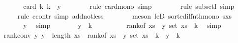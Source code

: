 \begin{isabellebody}
\ \ \ \ \isamarkupfalse%
\ \isamarkupfalse%
\ {\isachardoublequoteopen}{\isachardot}{\kern0pt}{\isachardot}{\kern0pt}{\isachardot}{\kern0pt}\ {\isasymle}\ card\ {\isacharbraceleft}{\kern0pt}k{\isachardot}{\kern0pt}\ k\ {\isacharless}{\kern0pt}\ y{\isacharbraceright}{\kern0pt}{\isachardoublequoteclose}\isanewline
\ \ \ \ \ \ \isamarkupfalse%
\ {\isacharparenleft}{\kern0pt}rule\ card{\isacharunderscore}{\kern0pt}mono{\isacharcomma}{\kern0pt}\ simp{\isacharparenright}{\kern0pt}\isanewline
\ \ \ \ \ \ \isamarkupfalse%
\ {\isacharparenleft}{\kern0pt}rule\ subsetI{\isacharcomma}{\kern0pt}\ simp{\isacharparenright}{\kern0pt}\isanewline
\ \ \ \ \ \ \isamarkupfalse%
\ {\isacharparenleft}{\kern0pt}rule\ ccontr{\isacharcomma}{\kern0pt}\ simp\ add{\isacharcolon}{\kern0pt}not{\isacharunderscore}{\kern0pt}less{\isacharparenright}{\kern0pt}\isanewline
\ \ \ \ \ \ \isamarkupfalse%
\ {\isacharparenleft}{\kern0pt}meson\ leD\ sorted{\isacharunderscore}{\kern0pt}iff{\isacharunderscore}{\kern0pt}nth{\isacharunderscore}{\kern0pt}mono\ s{\isacharunderscore}{\kern0pt}xs{\isacharparenright}{\kern0pt}\isanewline
\ \ \ \ \isamarkupfalse%
\ \isamarkupfalse%
\ {\isachardoublequoteopen}{\isachardot}{\kern0pt}{\isachardot}{\kern0pt}{\isachardot}{\kern0pt}\ {\isacharequal}{\kern0pt}\ y{\isachardoublequoteclose}\ \isamarkupfalse%
\ simp\isanewline
\ \ \ \ \isamarkupfalse%
\ \isamarkupfalse%
\ {\isachardoublequoteopen}y\ {\isacharless}{\kern0pt}\ k\ {\isacharplus}{\kern0pt}\ {}{\isachardoublequoteclose}\isanewline
\ \ \ \ \isamarkupfalse%
\ \isamarkupfalse%
\ {\isachardoublequoteopen}rank{\isacharunderscore}{\kern0pt}of\ {\isacharparenleft}{\kern0pt}xs\ {\isacharbang}{\kern0pt}\ y{\isacharparenright}{\kern0pt}\ {\isacharparenleft}{\kern0pt}set\ xs{\isacharparenright}{\kern0pt}\ {\isacharless}{\kern0pt}\ k{\isacharplus}{\kern0pt}{}{\isachardoublequoteclose}\ \isamarkupfalse%
\ simp\isanewline
\ \ \isamarkupfalse%
\isanewline
\isanewline
\ \ \isamarkupfalse%
\ rank{\isacharunderscore}{\kern0pt}conv{\isacharcolon}{\kern0pt}\ {\isachardoublequoteopen}{\isasymAnd}y{\isachardot}{\kern0pt}\ y\ {\isacharless}{\kern0pt}\ length\ xs\ {\isasymLongrightarrow}\ rank{\isacharunderscore}{\kern0pt}of\ {\isacharparenleft}{\kern0pt}xs\ {\isacharbang}{\kern0pt}\ y{\isacharparenright}{\kern0pt}\ {\isacharparenleft}{\kern0pt}set\ xs{\isacharparenright}{\kern0pt}\ {\isacharless}{\kern0pt}\ k{\isacharplus}{\kern0pt}{}\ {\isasymlongleftrightarrow}\ y\ {\isacharless}{\kern0pt}\ k{\isacharplus}{\kern0pt}{}{\isachardoublequoteclose}\isanewline

\end{isabellebody}
